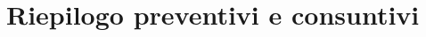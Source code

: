 \section{Riepilogo preventivi e consuntivi}

\begin{comment}
\subsection{Preventivo totale}
Per questa sezione per approfondimenti si rimanda al documento \emph{"Dichiarazione impegni v1.2"} citato nella sezione \ref{sec:rif_inf} \emph{"Riferimenti informativi"}.\\
Come riportato dal sopracitato documento, i costi orari per ogni membro in base al ruolo sono i seguenti:
\begin{table}[htbp]
    \centering    
    \begin{spreadtab}{{tabular}{|c|c|c|c|c|c|c|c|}}
    \hline
    @\textbf{Membro} & @\textbf{Re} & @\textbf{Amm} & @\textbf{An} & @\textbf{Progr} & @\textbf{Proge} & @\textbf{Ve} & @\textbf{Totale} \\
    \hline
    @ Samuele V.   & 12          & 9          & 15         & 25          & 16     & 16     & sum(b2:g2) \\
    @ Leonardo B.  & 12         & 9          & 15         & 25          & 16     & 16     & sum(b3:g3) \\
    @ Riccardo Z.  & 12          & 9          & 15          & 25          & 16     & 16     & sum(b4:g4) \\
    @ Davide B.    & 12          & 9          & 15       & 25          & 16     & 16     & sum(b5:g5) \\
    @ Michele Z.   & 12          & 9          & 15         & 25          & 16     & 16     & sum(b6:g6) \\
    @ Filippo T.   & 12          & 9          & 15          & 25         & 16     & 16     & sum(b7:g7) \\
    \hline
    @\textbf{Ore totali} & sum(b2:b7) & sum(c2:c7) & sum(d2:d7) & sum(e2:e7) & sum(f2:f7) & sum(g2:g7) &  sum(b8:g8)\\
    \hline
    @\textbf{Costo totale} & 30*b8 & 20*c8 & 25*d8 & 15*e8 & 25*f8 & 15*g8 & sum(b9:g9)\\
    \hline
    \end{spreadtab}
    \caption{Preventivo orario ed economico totale, in base al ruolo}
    \label{tab:prev_totale}
    \vspace{5mm}
    \textbf{Legenda:} \textit{Re} = Responsabile, \textit{Amm} = Amministratore, \textit{An} = Analista, \textit{Progr} = Programmatore, \textit{Proge} = Progettista, \textit{Ve} = Verificatore
\end{table}
\end{comment}

